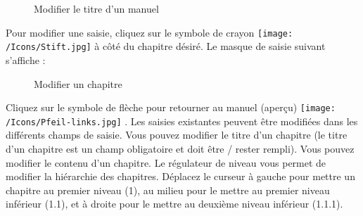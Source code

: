 \begin{figure}[H]
\caption{Modifier le titre d'un manuel}
\end{figure}

Pour modifier une saisie, cliquez sur le symbole de crayon \texttt{[image: /Icons/Stift.jpg]} à côté du chapitre désiré. Le masque de saisie suivant s'affiche :

\begin{figure}[H]
\caption{Modifier un chapitre}
\end{figure}

Cliquez sur le symbole de flèche pour retourner au manuel (aperçu) \texttt{[image: /Icons/Pfeil-links.jpg]} . Les saisies existantes peuvent être modifiées dans les différents champs de saisie. Vous pouvez modifier le titre d'un chapitre  (le titre d'un chapitre est un champ obligatoire et doit être / rester rempli). Vous pouvez modifier le contenu  d'un chapitre. Le régulateur de niveau  vous permet de modifier la hiérarchie des chapitres. Déplacez le curseur à gauche pour mettre un chapitre au premier niveau (1), au milieu pour le mettre au premier niveau inférieur (1.1), et à droite pour le mettre au deuxième niveau inférieur (1.1.1). \\

